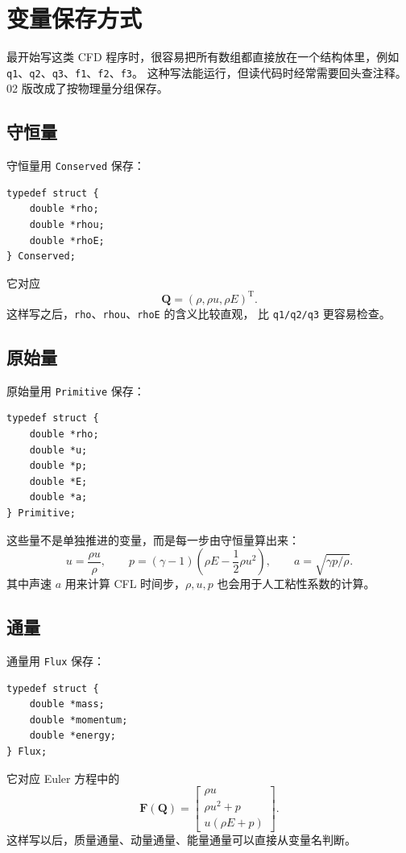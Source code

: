 \section{变量保存方式}

最开始写这类 CFD 程序时，很容易把所有数组都直接放在一个结构体里，例如
\texttt{q1}、\texttt{q2}、\texttt{q3}、\texttt{f1}、\texttt{f2}、\texttt{f3}。
这种写法能运行，但读代码时经常需要回头查注释。02 版改成了按物理量分组保存。

\subsection{守恒量}

守恒量用 \texttt{Conserved} 保存：
\begin{lstlisting}
typedef struct {
    double *rho;
    double *rhou;
    double *rhoE;
} Conserved;
\end{lstlisting}

它对应
\[
\bm Q=(\rho,\rho u,\rho E)^{\mathrm T}.
\]
这样写之后，\texttt{rho}、\texttt{rhou}、\texttt{rhoE} 的含义比较直观，
比 \texttt{q1/q2/q3} 更容易检查。

\subsection{原始量}

原始量用 \texttt{Primitive} 保存：
\begin{lstlisting}
typedef struct {
    double *rho;
    double *u;
    double *p;
    double *E;
    double *a;
} Primitive;
\end{lstlisting}

这些量不是单独推进的变量，而是每一步由守恒量算出来：
\[
u=\frac{\rho u}{\rho},
\qquad
p=(\gamma-1)\left(\rho E-\frac12 \rho u^2\right),
\qquad
a=\sqrt{\gamma p/\rho}.
\]
其中声速 \(a\) 用来计算 CFL 时间步，\(\rho,u,p\) 也会用于人工粘性系数的计算。

\subsection{通量}

通量用 \texttt{Flux} 保存：
\begin{lstlisting}
typedef struct {
    double *mass;
    double *momentum;
    double *energy;
} Flux;
\end{lstlisting}

它对应 Euler 方程中的
\[
\bm F(\bm Q)=
\begin{bmatrix}
\rho u\\
\rho u^2+p\\
u(\rho E+p)
\end{bmatrix}.
\]
这样写以后，质量通量、动量通量、能量通量可以直接从变量名判断。

